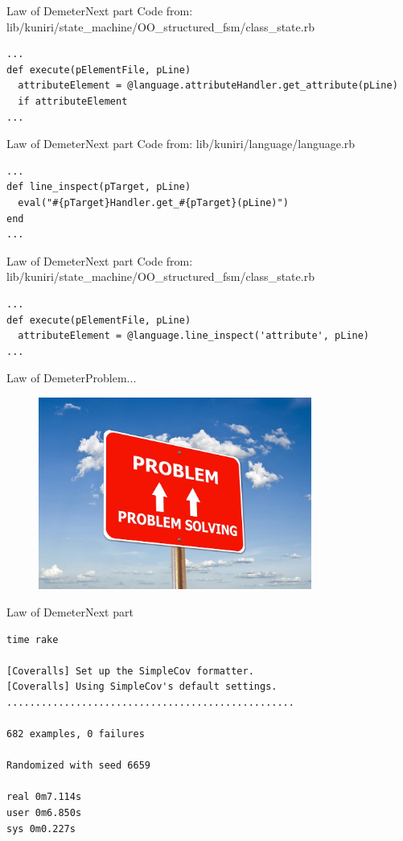 \documentclass[10pt]{beamer}
\begin{document}
\begin{frame}[fragile]{Law of Demeter}{Next part}
Code from: lib/kuniri/state\_machine/OO\_structured\_fsm/class\_state.rb
\small
\begin{lstlisting}
...
def execute(pElementFile, pLine)
  attributeElement = @language.attributeHandler.get_attribute(pLine)
  if attributeElement
...
\end{lstlisting}
\end{frame}

\begin{frame}[fragile]{Law of Demeter}{Next part}
Code from: lib/kuniri/language/language.rb
\small
\begin{lstlisting}
...
def line_inspect(pTarget, pLine)
  eval("#{pTarget}Handler.get_#{pTarget}(pLine)")
end
...
\end{lstlisting}
\end{frame}

\begin{frame}[fragile]{Law of Demeter}{Next part}
Code from: lib/kuniri/state\_machine/OO\_structured\_fsm/class\_state.rb
\small
\begin{lstlisting}
...
def execute(pElementFile, pLine)
  attributeElement = @language.line_inspect('attribute', pLine)
...
\end{lstlisting}
\end{frame}

\begin{frame}[fragile]{Law of Demeter}{Problem...}
  \begin{figure}[overview]
    \includegraphics[width=0.8\textwidth]{images/problem.jpg}
  \end{figure}
\end{frame}

\begin{frame}[fragile]{Law of Demeter}{Next part}
\small
\begin{lstlisting}
time rake

[Coveralls] Set up the SimpleCov formatter.
[Coveralls] Using SimpleCov's default settings.
..................................................

682 examples, 0 failures

Randomized with seed 6659

real 0m7.114s
user 0m6.850s
sys 0m0.227s
\end{lstlisting}
\end{frame}
\end{document}
